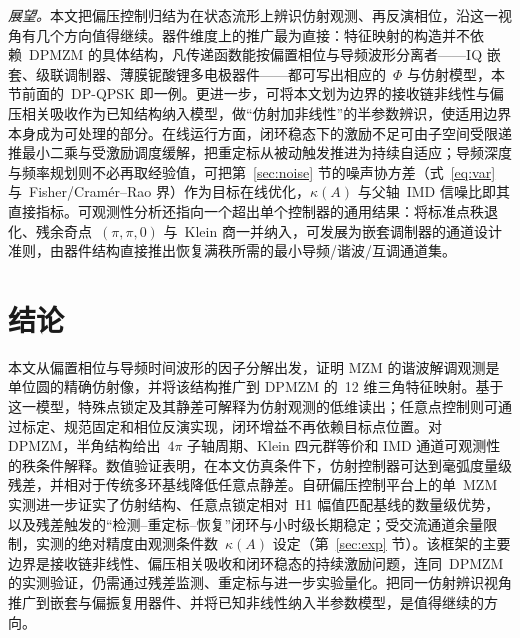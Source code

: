 \documentclass[11pt,journal,onecolumn]{IEEEtran}
\theoremstyle{plain}
\theoremstyle{remark}
\begin{document}
\emph{展望。}本文把偏压控制归结为在状态流形上辨识仿射观测、再反演相位，沿这一视角有几个方向值得继续。器件维度上的推广最为直接：特征映射的构造并不依赖~DPMZM 的具体结构，凡传递函数能按偏置相位与导频波形分离者——IQ 嵌套、级联调制器、薄膜铌酸锂多电极器件——都可写出相应的~$\Phi$ 与仿射模型，本节前面的~DP-QPSK 即一例。更进一步，可将本文划为边界的接收链非线性与偏压相关吸收作为已知结构纳入模型，做“仿射加非线性”的半参数辨识，使适用边界本身成为可处理的部分。在线运行方面，闭环稳态下的激励不足可由子空间受限递推最小二乘与受激励调度缓解，把重定标从被动触发推进为持续自适应；导频深度与频率规划则不必再取经验值，可把第~\ref{sec:noise} 节的噪声协方差（式~\eqref{eq:var} 与~Fisher/Cram\'er--Rao 界）作为目标在线优化，$\kappa(A)$ 与父轴~IMD 信噪比即其直接指标。可观测性分析还指向一个超出单个控制器的通用结果：将标准点秩退化、残余奇点~$(\pi,\pi,0)$ 与~Klein 商一并纳入，可发展为嵌套调制器的通道设计准则，由器件结构直接推出恢复满秩所需的最小导频/谐波/互调通道集。

\section{结论}
本文从偏置相位与导频时间波形的因子分解出发，证明 MZM 的谐波解调观测是单位圆的精确仿射像，并将该结构推广到 DPMZM 的~12 维三角特征映射。基于这一模型，特殊点锁定及其静差可解释为仿射观测的低维读出；任意点控制则可通过标定、规范固定和相位反演实现，闭环增益不再依赖目标点位置。对 DPMZM，半角结构给出~$4\pi$ 子轴周期、Klein 四元群等价和 IMD 通道可观测性的秩条件解释。数值验证表明，在本文仿真条件下，仿射控制器可达到毫弧度量级残差，并相对于传统多环基线降低任意点静差。自研偏压控制平台上的单~MZM 实测进一步证实了仿射结构、任意点锁定相对~H1 幅值匹配基线的数量级优势，以及残差触发的“检测--重定标--恢复”闭环与小时级长期稳定；受交流通道余量限制，实测的绝对精度由观测条件数~$\kappa(A)$ 设定（第~\ref{sec:exp} 节）。该框架的主要边界是接收链非线性、偏压相关吸收和闭环稳态的持续激励问题，连同~DPMZM 的实测验证，仍需通过残差监测、重定标与进一步实验量化。把同一仿射辨识视角推广到嵌套与偏振复用器件、并将已知非线性纳入半参数模型，是值得继续的方向。

\appendices
\end{document}

